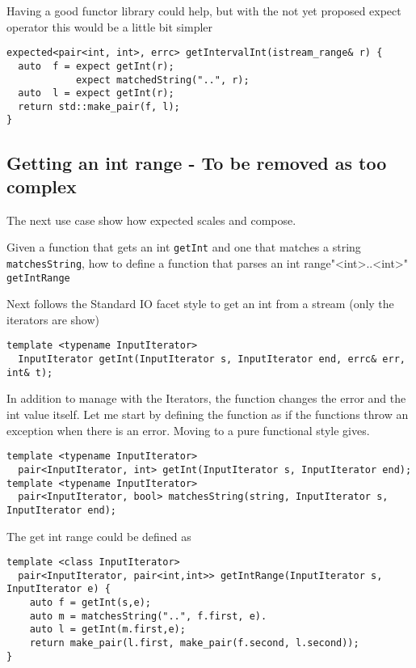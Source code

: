 \documentclass[a4paper,10pt]{article}
\newcommand{\cpp}[1]{\lstinline{#1}}
\begin{document}
Having a good functor library could help, but with the not yet proposed expect operator this would be a little bit simpler

\begin{lstlisting}
expected<pair<int, int>, errc> getIntervalInt(istream_range& r) {
  auto  f = expect getInt(r);
            expect matchedString("..", r);
  auto  l = expect getInt(r);
  return std::make_pair(f, l);
}
\end{lstlisting}

\subsection{Getting an int range - To be removed as too complex}

The next use case show how expected scales and compose. 

Given a function that gets an int \cpp{getInt} and one that matches a string \cpp{matchesString}, how to define a function that parses an int range"<int>..<int>" \cpp{getIntRange}

Next follows the Standard IO facet style to get an int from a stream (only the iterators are show)

\begin{lstlisting}
template <typename InputIterator>
  InputIterator getInt(InputIterator s, InputIterator end, errc& err, int& t);
\end{lstlisting}

In addition to manage with the Iterators, the function changes the error and the int value itself. Let me start by defining the function as if the functions throw an exception when there is an error. Moving to a pure functional style gives.

\begin{lstlisting}
template <typename InputIterator>
  pair<InputIterator, int> getInt(InputIterator s, InputIterator end);
template <typename InputIterator>
  pair<InputIterator, bool> matchesString(string, InputIterator s, InputIterator end);
\end{lstlisting}

The get int range could be defined as

\begin{lstlisting}
template <class InputIterator>
  pair<InputIterator, pair<int,int>> getIntRange(InputIterator s, InputIterator e) {
    auto f = getInt(s,e);
    auto m = matchesString("..", f.first, e).
    auto l = getInt(m.first,e);       
    return make_pair(l.first, make_pair(f.second, l.second));
}
\end{lstlisting}
\end{document}
